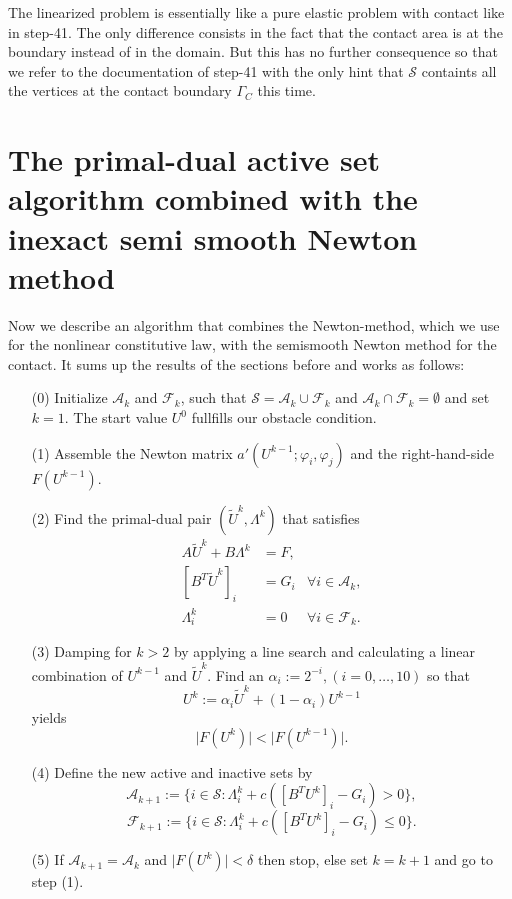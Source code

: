 \documentclass{article}
\begin{document}
The linearized problem is essentially like a pure elastic problem with contact like
in step-41. The only difference consists in the fact that the contact area
is at the boundary instead of in the domain. But this has no further consequence
so that we refer to the documentation of step-41 with the only hint that
$\mathcal{S}$ containts all the vertices at the contact boundary $\Gamma_C$ this
time.

\section{The primal-dual active set algorithm combined with the inexact semi smooth
Newton method}

Now we describe an algorithm that combines the Newton-method, which we use for
the nonlinear constitutive law, with the semismooth Newton method for the contact. It
sums up the results of the sections before and works as follows:
\begin{itemize}
 \item[(0)] Initialize $\mathcal{A}_k$ and $\mathcal{F}_k$, such that
 $\mathcal{S} = \mathcal{A}_k \cup \mathcal{F}_k$ and $\mathcal{A}_k \cap
 \mathcal{F}_k = \emptyset$ and set $k = 1$. The start value $U^0$ fullfills our
 obstacle condition.
 \item[(1)] Assemble the Newton matrix $a'(U^{k-1};\varphi_i,\varphi_j)$ and the
 right-hand-side $F(U^{k-1})$.
 \item[(2)] Find the primal-dual pair $(\tilde U^k,\Lambda^k)$ that satisfies
 \begin{align*}
 A\tilde U^k + B\Lambda^k & = F, &\\
 \left[B^T\tilde U^k\right]_i & = G_i & \forall i\in\mathcal{A}_k,\\
 \Lambda^k_i & = 0 & \forall i\in\mathcal{F}_k.
 \end{align*}
 \item[(3)] Damping for $k>2$ by applying a line search and calculating a linear
 combination of $U^{k-1}$ and $\tilde U^k$. Find an
 $\alpha_i:=2^{-i},(i=0,\ldots,10)$ so that $$U^k := \alpha_i\tilde U^k +
 (1-\alpha_i)U^{k-1}$$ yields $$\vert
 F\left(U^{k}\right) \vert < \vert F\left(U^{k-1}\right) \vert.$$
 \item[(4)] Define the new active and inactive sets by
 $$\mathcal{A}_{k+1}:=\lbrace i\in\mathcal{S}:\Lambda^k_i +
 c\left(\left[B^TU^k\right]_i - G_i\right) > 0\rbrace,$$
 $$\mathcal{F}_{k+1}:=\lbrace i\in\mathcal{S}:\Lambda^k_i +
 c\left(\left[B^TU^k\right]_i - G_i\right) \leq 0\rbrace.$$
 \item[(5)] If $\mathcal{A}_{k+1} = \mathcal{A}_k$ and $\vert
 F\left(U^{k}\right) \vert < \delta$ then stop, else set $k=k+1$ and go to
 step (1).
\end{itemize}
\end{document}
